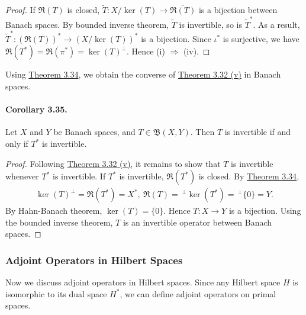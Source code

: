 \documentclass{article}
\begin{document}
\begin{proof}
If $\mathfrak{R}(T)$ is closed, $\widetilde{T}:X/\ker(T)\to\overline{\mathfrak{R}(T)}$ is a bijection between Banach spaces. By bounded inverse theorem, $\widetilde{T}$ is invertible, so is $\widetilde{T}^*$. As a result, $\widetilde{T}^*:(\mathfrak{R}(T))^*\to(X/\ker(T))^*$ is a bijection. Since $\iota^*$ is surjective, we have $\mathfrak{R}(T^*)=\mathfrak{R}(\pi^*)=\ker(T)^\perp$. Hence (i) $\Rightarrow$ (iv).
\end{proof}

Using \hyperref[thm:3.34]{Theorem 3.34}, we obtain the converse of \hyperref[thm:3.32]{Theorem 3.32 (v)} in Banach spaces.

\paragraph{Corollary 3.35.\label{cor:3.35}} Let $X$ and $Y$ be Banach spaces, and $T\in\mathfrak{B}(X,Y)$. Then $T$ is invertible if and only if $T^*$ is invertible.
\begin{proof}
Following \hyperref[thm:3.32]{Theorem 3.32 (v)}, it remains to show that $T$ is invertible whenever $T^*$ is invertible. If $T^*$ is invertible, $\mathfrak{R}(T^*)$ is closed. By \hyperref[thm:3.34]{Theorem 3.34},
\begin{align*}
	\ker(T)^\perp = \mathfrak{R}(T^*) = X^*,\ \mathfrak{R}(T)=\,^\perp\ker(T^*) = \,^\perp\{0\} = Y.
\end{align*}
By Hahn-Banach theorem, $\ker(T)=\{0\}$. Hence $T:X\to Y$ is a bijection. Using the bounded inverse theorem, $T$ is an invertible operator between Banach spaces.
\end{proof}

\subsubsection{Adjoint Operators in Hilbert Spaces}

Now we discuss adjoint operators in Hilbert spaces. Since any Hilbert space $H$ is isomorphic to its dual space $H^*$, we can define adjoint operators on primal spaces.
\end{document}
